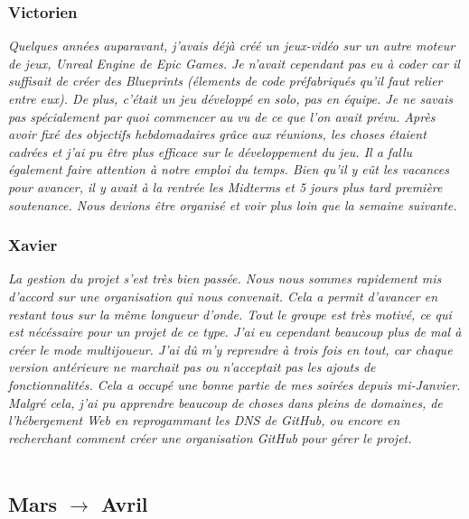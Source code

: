 \documentclass[a4paper,12pt]{article}
\begin{document}
        \subsubsection{Victorien}
        \textit{Quelques années auparavant, j’avais déjà créé un jeux-vidéo 
        sur un autre moteur de jeux, \textsl{Unreal Engine} de \textsl{Epic Games}. 
        Je n’avait cependant pas eu à coder car il suffisait de créer des
        \textsl{Blueprints} (élements de code préfabriqués qu’il faut relier 
        entre eux). De plus, c’était un jeu développé en solo, pas en équipe.
        Je ne savais pas spécialement par quoi commencer au vu de ce que l’on
        avait prévu. Après avoir fixé des objectifs hebdomadaires grâce aux 
        réunions, les choses étaient cadrées et j’ai pu être plus efficace sur
        le développement du jeu. Il a fallu également faire attention à notre 
        emploi du temps. Bien qu’il y eût les vacances pour avancer, il y avait 
        à la rentrée les Midterms et 5 jours plus tard première soutenance. 
        Nous devions être organisé et voir plus loin que la semaine suivante.}
  
        \subsubsection{Xavier}
        \textit{La gestion du projet s'est très bien passée. Nous nous sommes
        rapidement mis d'accord sur une organisation qui nous convenait. Cela a
        permit d'avancer en restant tous sur la même longueur d'onde. Tout le
        groupe est très motivé, ce qui est nécéssaire pour un projet de ce type.
        J'ai eu cependant beaucoup plus de mal à créer le mode multijoueur. J'ai
        dû m'y reprendre à trois fois en tout, car chaque version antérieure
        ne marchait pas ou n'acceptait pas les ajouts de fonctionnalités. Cela a
        occupé une bonne partie de mes soirées depuis mi-Janvier. Malgré cela, 
        j'ai pu apprendre beaucoup de choses dans pleins de domaines, de
        l'hébergement Web en reprogammant les \textit{DNS} de \textsl{GitHub}, 
        ou encore en recherchant comment créer une organisation \textsl{GitHub} 
        pour gérer le projet.}\\\\
    
     \subsection{Mars $\to$ Avril}
\end{document}
